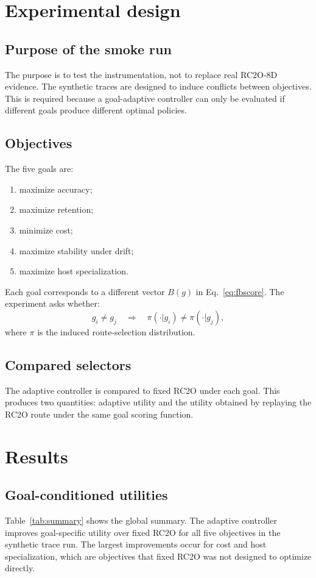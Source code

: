 \documentclass[11pt,a4paper]{article}
\begin{document}
\section{Experimental design}
\subsection{Purpose of the smoke run}
The purpose is to test the instrumentation, not to replace real RC2O-8D evidence. The synthetic traces are designed to induce conflicts between objectives. This is required because a goal-adaptive controller can only be evaluated if different goals produce different optimal policies.

\subsection{Objectives}
The five goals are:
\begin{enumerate}[label=\textbf{Goal \Alph*:},leftmargin=*]
    \item maximize accuracy;
    \item maximize retention;
    \item minimize cost;
    \item maximize stability under drift;
    \item maximize host specialization.
\end{enumerate}

Each goal corresponds to a different vector $B(g)$ in Eq.~\ref{eq:fbscore}. The experiment asks whether:
\begin{equation}
 g_i \neq g_j \quad \Rightarrow \quad \pi(\cdot|g_i) \neq \pi(\cdot|g_j),
\end{equation}
where $\pi$ is the induced route-selection distribution.

\subsection{Compared selectors}
The adaptive controller is compared to fixed RC2O under each goal. This produces two quantities: adaptive utility and the utility obtained by replaying the RC2O route under the same goal scoring function.

\section{Results}
\subsection{Goal-conditioned utilities}
Table~\ref{tab:summary} shows the global summary. The adaptive controller improves goal-specific utility over fixed RC2O for all five objectives in the synthetic trace run. The largest improvements occur for cost and host specialization, which are objectives that fixed RC2O was not designed to optimize directly.
\end{document}
